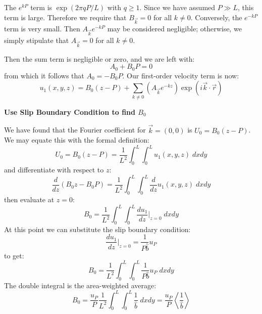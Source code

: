 \documentclass[12pt, a4paper, twoside, openright]{book}
\begin{document}

The $e^{kP}$ term is $ \exp ( 2 \pi q P/L )$ with $q \geq 1$.  Since we have assumed $P \gg L$, this term is large. Therefore we require that $B_{\vec{k}} = 0$ for all $k \neq 0$.  
Conversely, the $e^{-kP}$ term is very small.  Then $A_{\vec{k}} e^{-kP}$ may be considered negligible; otherwise, we simply stipulate that $A_{\vec{k}} = 0$ for all $k \neq 0$.


Then the sum term is negligible or zero, and we are left with:
\begin{equation}
A_0 + B_0 P = 0
\end{equation}
from which it follows that $A_0 = - B_0 P $.  Our first-order velocity term is now:
\begin{equation}
u_1(x,y,z) =  B_0 (z - P) + \sum_{k \neq 0} 
\left(  A_{\vec{k}} e^{-kz} \right)
\exp(i \vec{k}\cdot \vec{r})
\end{equation}

\textbf{Use Slip Boundary Condition to find $B_0$}

We have found that the Fourier coefficient for $\vec{k} = (0,0)$ is $U_0 = B_0 (z - P)$.
We may equate this with the formal definition:
\begin{equation}
U_0 = B_0 (z - P) = \frac{1}{L^2} \int_0^L \int_0^L u_1(x,y,z) \;dxdy
\end{equation}
and differentiate with respect to $z$:
\begin{equation}
\frac{d}{dz} ( B_0 z - B_0 P) = \frac{1}{L^2} \int_0^L \int_0^L \frac{d}{dz} u_1(x,y,z) \;dxdy
\end{equation}
then evaluate at $z=0$:
\begin{equation}
B_0 = \frac{1}{L^2} \int_0^L \int_0^L \frac{d u_1}{dz} \rvert_{z=0} \;dxdy
\end{equation}
At this point we can substitute the slip boundary condition:
\begin{equation}
\frac{d u_1}{d z} \rvert_{z=0} = \frac{1}{P \hat{b}} u_P
\end{equation}
to get:
\begin{equation}
B_0 = \frac{1}{L^2} \int_0^L \int_0^L \frac{1}{P \hat{b}} u_P \;dxdy
\end{equation}
The double integral is the area-weighted average:
\begin{equation}
B_0 = \frac{u_P}{P} \frac{1}{L^2} \int_0^L \int_0^L \frac{1}{\hat{b}} \;dxdy
= \frac{u_P}{P} \left< \frac{1}{\hat{b}} \right>
\end{equation}
\end{document}
